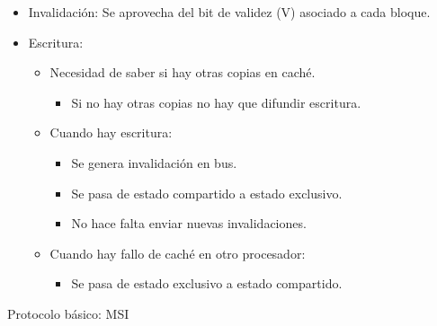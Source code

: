 \documentclass[12pt, twoside, openright]{report} %
\begin{document}
\begin{itemize}

	\item Invalidación: Se aprovecha del bit de validez (V) asociado a
	      cada bloque.
	\item Escritura:

	      \begin{itemize}

		      \item Necesidad de saber si hay otras copias en caché.

		            \begin{itemize}

			            \item Si no hay otras copias no hay que difundir escritura.
		            \end{itemize}
		      \item Cuando hay escritura:

		            \begin{itemize}

			            \item Se genera invalidación en bus.
			            \item Se pasa de estado compartido a estado exclusivo.
			            \item No hace falta enviar nuevas invalidaciones.
		            \end{itemize}
		      \item Cuando hay fallo de caché en otro procesador:

		            \begin{itemize}

			            \item Se pasa de estado exclusivo a estado compartido.
		            \end{itemize}
	      \end{itemize}
\end{itemize}

Protocolo básico: MSI
\end{document}
